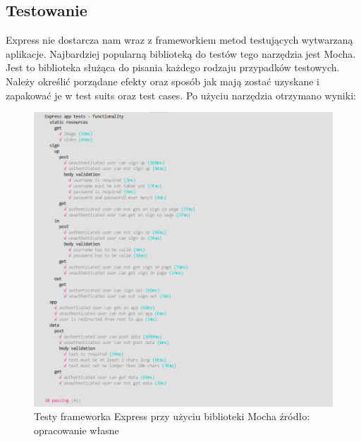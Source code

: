 \documentclass[12pt]{report}
\begin{document}
    \subsection{Testowanie}
      Express nie dostarcza nam wraz z frameworkiem metod testujących wytwarzaną aplikacje. 
      Najbardziej popularną biblioteką do testów tego narzędzia jest Mocha.
      Jest to biblioteka służąca do pisania każdego rodzaju przypadków testowych.
      Należy określić porządane efekty oraz sposób jak mają zostać uzyskane i zapakować je w test suits oraz test cases.
      Po użyciu narzędzia otrzymano wyniki:
      \begin{figure}[!hb]
        \centering
        \includegraphics[width=\textwidth,height=\textheight,keepaspectratio]{test_express.png} 
        \caption{Testy frameworka Express przy użyciu biblioteki Mocha \newline źródło: opracowanie własne}
      \end{figure}
\end{document}
